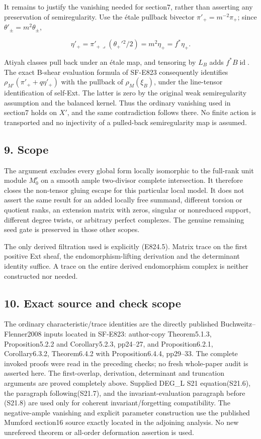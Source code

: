 It remains to justify the vanishing needed for section7, rather than
asserting any preservation of semiregularity. Use the étale pullback
bivector \(\pi'_+=m^{-2}\pi_+\); since \(\theta'_\pm=m^2\theta_\pm\),

\[
 \eta'_+=\pi'_+\mathbin{\lrcorner}(\theta_+'{}^2/2)
         =m^2\eta_+=f^*\eta_+.
 \tag{E824.16}
\]

Atiyah classes pull back under an étale map, and tensoring by \(L_B\)
adds \(f^*B\operatorname{id}\). The exact B-shear evaluation formula of
SF-E823 consequently identifies \(\rho_{M'}(\pi'_++q\eta'_+)\) with the
pullback of \(\rho_M(\xi_B)\), under the line-tensor identification of
self-Ext. The latter is zero by the original weak semiregularity
assumption and the balanced kernel. Thus the ordinary vanishing used in
section7 holds on \(X'\), and the same contradiction follows there. No
finite action is transported and no injectivity of a pulled-back
semiregularity map is assumed.

\subsection{9. Scope}\label{SF-E824-scope}

The argument excludes every global form locally isomorphic to the
full-rank unit module \(M_0^r\) on a smooth ample two-divisor complete
intersection. It therefore closes the non-tensor gluing escape for this
particular local model. It does not assert the same result for an added
locally free summand, different torsion or quotient ranks, an extension
matrix with zeros, singular or nonreduced support, different degree
twists, or arbitrary perfect complexes. The genuine remaining seed gate
is preserved in those other scopes.

The only derived filtration used is explicitly (E824.5). Matrix trace on
the first positive Ext sheaf, the endomorphism-lifting derivation and
the determinant identity suffice. A trace on the entire derived
endomorphism complex is neither constructed nor needed.

\subsection{10. Exact source and check
scope}\label{SF-E824-exact-source-and-check-scope}

The ordinary characteristic/trace identities are the directly published
Buchweitz--Flenner2008 inputs located in SF-E823: author-copy
Theorem5.1.3, Proposition5.2.2 and Corollary5.2.3, pp24--27, and
Proposition6.2.1, Corollary6.3.2, Theorem6.4.2 with Proposition6.4.4,
pp29--33. The complete invoked proofs were read in the preceding checks;
no fresh whole-paper audit is asserted here. The first-overlap,
derivation, determinant and truncation arguments are proved completely
above. Supplied DEG\_L S21 equation(S21.6), the paragraph
following(S21.7), and the invariant-evaluation paragraph before (S21.8)
are used only for coherent invariant/forgetting compatibility. The
negative-ample vanishing and explicit parameter construction use the
published Mumford section16 source exactly located in the adjoining
analysis. No new unrefereed theorem or all-order deformation assertion
is used.
